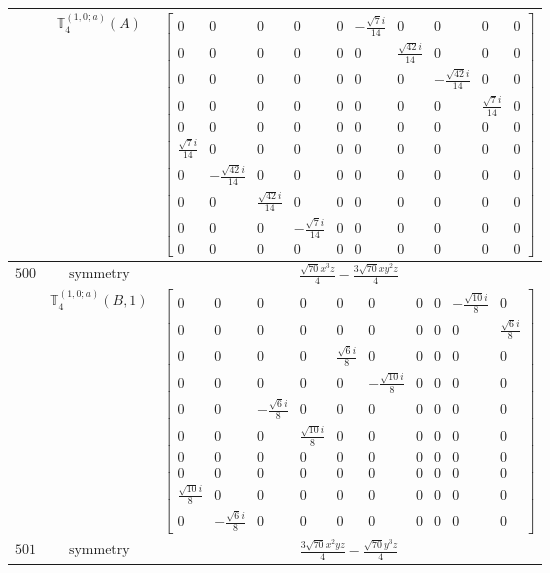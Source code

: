 \documentclass[fleqn,8pt,landscape]{jsarticle}
\begin{document}
\begin{longtable}{ccc}
$  $ & $ \mathbb{T}_{4}^{(1,0;a)}(A) $ & $ \begin{bmatrix} 0 & 0 & 0 & 0 & 0 & - \frac{\sqrt{7} i}{14} & 0 & 0 & 0 & 0 \\ 0 & 0 & 0 & 0 & 0 & 0 & \frac{\sqrt{42} i}{14} & 0 & 0 & 0 \\ 0 & 0 & 0 & 0 & 0 & 0 & 0 & - \frac{\sqrt{42} i}{14} & 0 & 0 \\ 0 & 0 & 0 & 0 & 0 & 0 & 0 & 0 & \frac{\sqrt{7} i}{14} & 0 \\ 0 & 0 & 0 & 0 & 0 & 0 & 0 & 0 & 0 & 0 \\ \frac{\sqrt{7} i}{14} & 0 & 0 & 0 & 0 & 0 & 0 & 0 & 0 & 0 \\ 0 & - \frac{\sqrt{42} i}{14} & 0 & 0 & 0 & 0 & 0 & 0 & 0 & 0 \\ 0 & 0 & \frac{\sqrt{42} i}{14} & 0 & 0 & 0 & 0 & 0 & 0 & 0 \\ 0 & 0 & 0 & - \frac{\sqrt{7} i}{14} & 0 & 0 & 0 & 0 & 0 & 0 \\ 0 & 0 & 0 & 0 & 0 & 0 & 0 & 0 & 0 & 0 \end{bmatrix} $ \\ \hline
$ 500 $ & $ \text{symmetry} $ & $ \frac{\sqrt{70} x^{3} z}{4} - \frac{3 \sqrt{70} x y^{2} z}{4} $ \\
$  $ & $ \mathbb{T}_{4}^{(1,0;a)}(B,1) $ & $ \begin{bmatrix} 0 & 0 & 0 & 0 & 0 & 0 & 0 & 0 & - \frac{\sqrt{10} i}{8} & 0 \\ 0 & 0 & 0 & 0 & 0 & 0 & 0 & 0 & 0 & \frac{\sqrt{6} i}{8} \\ 0 & 0 & 0 & 0 & \frac{\sqrt{6} i}{8} & 0 & 0 & 0 & 0 & 0 \\ 0 & 0 & 0 & 0 & 0 & - \frac{\sqrt{10} i}{8} & 0 & 0 & 0 & 0 \\ 0 & 0 & - \frac{\sqrt{6} i}{8} & 0 & 0 & 0 & 0 & 0 & 0 & 0 \\ 0 & 0 & 0 & \frac{\sqrt{10} i}{8} & 0 & 0 & 0 & 0 & 0 & 0 \\ 0 & 0 & 0 & 0 & 0 & 0 & 0 & 0 & 0 & 0 \\ 0 & 0 & 0 & 0 & 0 & 0 & 0 & 0 & 0 & 0 \\ \frac{\sqrt{10} i}{8} & 0 & 0 & 0 & 0 & 0 & 0 & 0 & 0 & 0 \\ 0 & - \frac{\sqrt{6} i}{8} & 0 & 0 & 0 & 0 & 0 & 0 & 0 & 0 \end{bmatrix} $ \\ \hline
$ 501 $ & $ \text{symmetry} $ & $ \frac{3 \sqrt{70} x^{2} y z}{4} - \frac{\sqrt{70} y^{3} z}{4} $ \\

\end{longtable}
\end{document}
